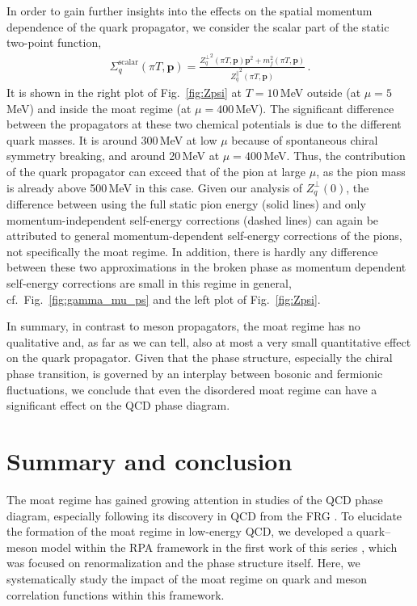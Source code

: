 \documentclass[reprint,english,superscriptaddress,preprintnumbers,amsmath,amssymb,aps,prd]{revtex4-2}
\def\Fig#1{Fig.~\ref{#1}}
\begin{document}
In order to gain further insights into the effects on the spatial momentum dependence of the quark propagator, we consider the scalar part of the static two-point function,
%
\begin{align}\label{eq:sigma_quark}
\Sigma^{\mathrm{scalar}}_q(\pi T,\boldsymbol{p})=\frac{{Z^\perp_q}^2(\pi T, \boldsymbol{p}) \boldsymbol{p}^2 + m_f^2(\pi T,\boldsymbol{p})}{{Z^\|_q}^2(\pi T,\boldsymbol{p})}\,.
\end{align}
%
It is shown in the right plot of \Fig{fig:Zpsi} at $T=10$\,MeV outside (at $\mu=5$\,MeV) and inside the moat regime (at $\mu=400$\,MeV). The significant difference between the propagators at these two chemical potentials is due to the different quark masses. It is around 300\,MeV at low $\mu$ because of spontaneous chiral symmetry breaking, and around 20\,MeV at $\mu=400$\,MeV. Thus, the contribution of the quark propagator can exceed that of the pion at large $\mu$, as the pion mass is already above 500\,MeV in this case. Given our analysis of $Z^\perp_q(0)$, the difference between using the full static pion energy (solid lines) and only momentum-independent self-energy corrections (dashed lines) can again be attributed to general momentum-dependent self-energy corrections of the pions, not specifically the moat regime. In addition, there is hardly any difference between these two approximations in the broken phase as momentum dependent self-energy corrections are small in this regime in general, cf.\ \Fig{fig:gamma_mu_ps} and the left plot of \Fig{fig:Zpsi}.

In summary, in contrast to meson propagators, the moat regime has no qualitative and, as far as we can tell, also at most a very small quantitative effect on the quark propagator. Given that the phase structure, especially the chiral phase transition, is governed by an interplay between bosonic and fermionic fluctuations, we conclude that even the disordered moat regime can have a significant effect on the QCD phase diagram.   


\section{Summary and conclusion}\label{sec:summary}
The moat regime has gained growing attention in studies of the QCD phase diagram, especially following its discovery in QCD from the FRG \cite{Fu:2019hdw,Fu:2024rto,Pawlowski:2025jpg, Fu:2026qnl}. To elucidate the formation of the moat regime in low-energy QCD, we developed a quark–meson model within the RPA framework in the first work of this series \cite{Rennecke:2025kub}, which was focused on renormalization and the phase structure itself. Here, we  systematically study the impact of the moat regime on quark and meson correlation functions within this framework.
\end{document}
